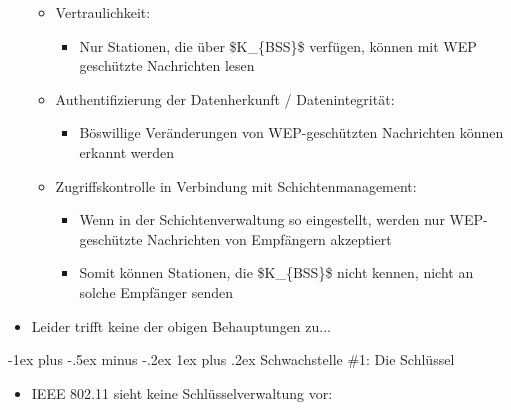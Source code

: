 \documentclass[a4paper]{article}
\makeatletter
\renewcommand{\subsubsection}{\@startsection{subsubsection}{3}{0mm}%
 {-1ex plus -.5ex minus -.2ex}%
 {1ex plus .2ex}%
 {\normalfont\small\bfseries}}
\makeatother
\begin{document}
\begin{multicols}{3}
\begin{itemize}
              \begin{itemize}
                  \item
                        Vertraulichkeit:

                        \begin{itemize}
                            \item
                                  Nur Stationen, die über \$K\_\{BSS\}\$ verfügen, können mit WEP
                                  geschützte Nachrichten lesen
                        \end{itemize}
                  \item
                        Authentifizierung der Datenherkunft / Datenintegrität:

                        \begin{itemize}
                            \item
                                  Böswillige Veränderungen von WEP-geschützten Nachrichten können
                                  erkannt werden
                        \end{itemize}
                  \item
                        Zugriffskontrolle in Verbindung mit Schichtenmanagement:

                        \begin{itemize}
                            \item
                                  Wenn in der Schichtenverwaltung so eingestellt, werden nur
                                  WEP-geschützte Nachrichten von Empfängern akzeptiert
                            \item
                                  Somit können Stationen, die \$K\_\{BSS\}\$ nicht kennen, nicht an
                                  solche Empfänger senden
                        \end{itemize}
              \end{itemize}
        \item
              Leider trifft keine der obigen Behauptungen zu...
    \end{itemize}


    \subsubsection{Schwachstelle \#1: Die
        Schlüssel}

    \begin{itemize}
        \item
              IEEE 802.11 sieht keine Schlüsselverwaltung vor:


\end{itemize}
\end{multicols}
\end{document}
